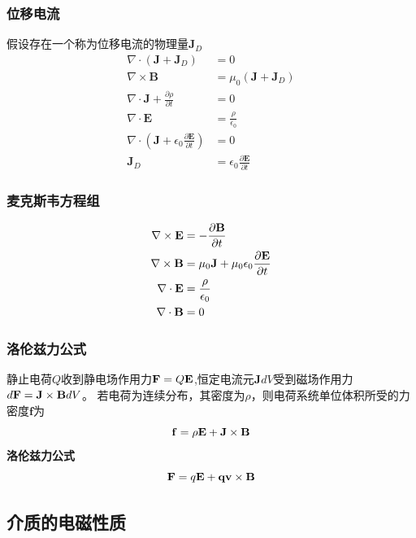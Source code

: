 \documentclass[12pt,a4paper]{ctexart}
\numberwithin{equation}{subsection}
\begin{document}
\subsubsection{位移电流}
假设存在一个称为位移电流的物理量$\mathbf{J}_D$
\begin{align}
\nabla\cdot(\mathbf{J}+\mathbf{J}_D)&=0\\
\nabla\times\mathbf{B}&=\mu_0(\mathbf{J}+\mathbf{J}_D)\\
\nabla\cdot\mathbf{J}+\frac{\partial \rho}{\partial t}&=0\\
\nabla\cdot\mathbf{E}&=\frac{\rho}{\epsilon_0}\\
\nabla\cdot(\mathbf{J}+\epsilon_0\frac{\partial\mathbf{E}}{\partial t})&=0\\
\mathbf{J}_D&=\epsilon_0\frac{\partial\mathbf{E}}{\partial t}
\end{align}

\subsubsection{麦克斯韦方程组}
\begin{equation}
\begin{aligned}
\nabla\times\mathbf{E}&=-\frac{\partial\mathbf{B}}{\partial t}\\
\nabla\times\mathbf{B}&=\mu_0\mathbf{J}+\mu_0\epsilon_0\frac{\partial\vb{E}}{\partial t}\\
\nabla\cdot\mathbf{E}&=\frac{\rho}{\epsilon_0}\\
\nabla\cdot\mathbf{B}&=0
\end{aligned}
\end{equation}

\subsubsection{洛伦兹力公式}
静止电荷$Q$收到静电场作用力$\vb{F}=Q\vb{E}$,恒定电流元$\mathbf{J}dV$受到磁场作用力$d\vb{F}=\mathbf{J}\times\mathbf{B}dV$。
若电荷为连续分布，其密度为$\rho$，则电荷系统单位体积所受的力密度$\mathbf{f}$为
\begin{equation}
\vb{f}=\rho\mathbf{E}+\vb{J}\times\vb{B}
\end{equation}
\textbf{洛伦兹力公式}
\begin{equation}
\vb{F}=q\vb{E}+\vb{qv}\times\vb{B}
\end{equation}

\subsection{介质的电磁性质}
\end{document}
